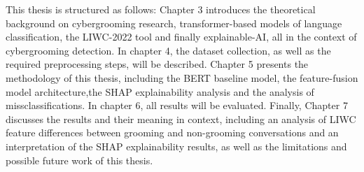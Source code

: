 This thesis is structured as follows: Chapter 3 introduces the theoretical background on cybergrooming research, transformer-based models of language classification, the LIWC-2022 tool and finally explainable-AI, all in the context of cybergrooming detection. In chapter 4, the dataset collection, as well as the required preprocessing steps, will be described. Chapter 5 presents the methodology of this thesis, including the BERT baseline model, the feature-fusion model architecture,the SHAP explainability analysis and the analysis of missclassifications. In chapter 6, all results will be evaluated. Finally, Chapter 7 discusses the results and their meaning in context, including an analysis of LIWC feature differences between grooming and non-grooming conversations and an interpretation of the SHAP explainability results, as well as the limitations and possible future work of this thesis.


